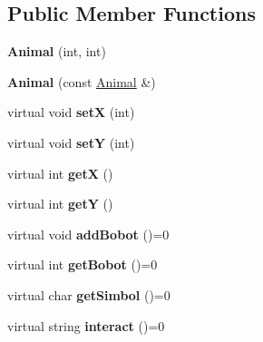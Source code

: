 \subsection*{Public Member Functions}
\begin{DoxyCompactItemize}
\item 
\hypertarget{classAnimal_ae11a2f590886f1772a68a85cc3cacf7c}{{\bfseries Animal} (int, int)}\label{classAnimal_ae11a2f590886f1772a68a85cc3cacf7c}

\item 
\hypertarget{classAnimal_a561ee143993ecb5d83f883dabc42087e}{{\bfseries Animal} (const \hyperlink{classAnimal}{Animal} \&)}\label{classAnimal_a561ee143993ecb5d83f883dabc42087e}

\item 
\hypertarget{classAnimal_a0f89d814c32fd67ce572649f99fab11c}{virtual void {\bfseries set\-X} (int)}\label{classAnimal_a0f89d814c32fd67ce572649f99fab11c}

\item 
\hypertarget{classAnimal_a7a9ee44c7d62feb1207191c5e2c5c34c}{virtual void {\bfseries set\-Y} (int)}\label{classAnimal_a7a9ee44c7d62feb1207191c5e2c5c34c}

\item 
\hypertarget{classAnimal_abf6061a8793776c9be833872ad61e8a3}{virtual int {\bfseries get\-X} ()}\label{classAnimal_abf6061a8793776c9be833872ad61e8a3}

\item 
\hypertarget{classAnimal_a4fcdf96fb0f36aed0ff4eb9f79c7aa11}{virtual int {\bfseries get\-Y} ()}\label{classAnimal_a4fcdf96fb0f36aed0ff4eb9f79c7aa11}

\item 
\hypertarget{classAnimal_aa3fcc58eb4b4f150bf5f9f357e06e7d6}{virtual void {\bfseries add\-Bobot} ()=0}\label{classAnimal_aa3fcc58eb4b4f150bf5f9f357e06e7d6}

\item 
\hypertarget{classAnimal_ada1c15009761c0a85070580f2dd513df}{virtual int {\bfseries get\-Bobot} ()=0}\label{classAnimal_ada1c15009761c0a85070580f2dd513df}

\item 
\hypertarget{classAnimal_ad3baac243ff9d03291a56dd135072472}{virtual char {\bfseries get\-Simbol} ()=0}\label{classAnimal_ad3baac243ff9d03291a56dd135072472}

\item 
\hypertarget{classAnimal_af2d9616bd719adff241a27bd1ba64725}{virtual string {\bfseries interact} ()=0}\label{classAnimal_af2d9616bd719adff241a27bd1ba64725}


\end{DoxyCompactItemize}
